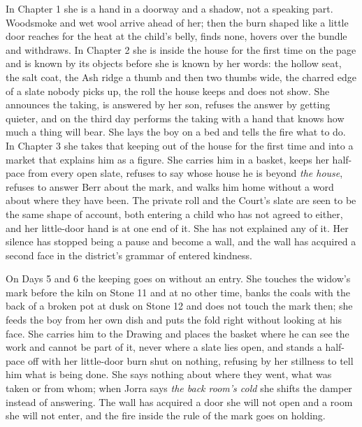 \documentclass{design/chronicle}
\begin{document}
{
In Chapter 1 she is a hand in a doorway and a shadow, not a speaking part. Woodsmoke and wet wool arrive ahead of her; then the burn shaped like a little door reaches for the heat at the child’s belly, finds none, hovers over the bundle and withdraws. In Chapter 2 she is inside the house for the first time on the page and is known by its objects before she is known by her words: the hollow seat, the salt coat, the Ash ridge a thumb and then two thumbs wide, the charred edge of a slate nobody picks up, the roll the house keeps and does not show. She announces the taking, is answered by her son, refuses the answer by getting quieter, and on the third day performs the taking with a hand that knows how much a thing will bear. She lays the boy on a bed and tells the fire what to do. In Chapter 3 she takes that keeping out of the house for the first time and into a market that explains him as a figure. She carries him in a basket, keeps her half-pace from every open slate, refuses to say whose house he is beyond \emph{the house}, refuses to answer Berr about the mark, and walks him home without a word about where they have been. The private roll and the Court’s slate are seen to be the same shape of account, both entering a child who has not agreed to either, and her little-door hand is at one end of it. She has not explained any of it. Her silence has stopped being a pause and become a wall, and the wall has acquired a second face in the district’s grammar of entered kindness.

On Days 5 and 6 the keeping goes on without an entry. She touches the widow’s mark before the kiln on Stone 11 and at no other time, banks the coals with the back of a broken pot at dusk on Stone 12 and does not touch the mark then; she feeds the boy from her own dish and puts the fold right without looking at his face. She carries him to the Drawing and places the basket where he can see the work and cannot be part of it, never where a slate lies open, and stands a half-pace off with her little-door burn shut on nothing, refusing by her stillness to tell him what is being done. She says nothing about where they went, what was taken or from whom; when Jorra says \emph{the back room’s cold} she shifts the damper instead of answering. The wall has acquired a door she will not open and a room she will not enter, and the fire inside the rule of the mark goes on holding.

}
\end{document}
